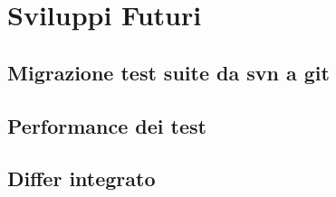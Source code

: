 \chapter{Sviluppi Futuri}
    \section{Migrazione test suite da svn a git}
    \section{Performance dei test}
    \section{Differ integrato}